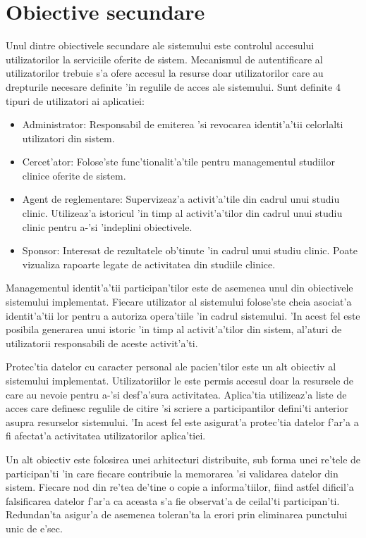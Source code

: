 \documentclass[12pt,a4paper,twoside]{report}
\begin{document}
\section{Obiective secundare}

    Unul dintre obiectivele secundare ale sistemului este controlul accesului utilizatorilor la serviciile oferite de sistem. Mecanismul de autentificare al utilizatorilor trebuie s'a ofere accesul la resurse doar utilizatorilor care au drepturile necesare definite 'in regulile de acces ale sistemului.
    Sunt definite 4 tipuri de utilizatori ai aplicatiei:
    \begin{itemize}
        \item Administrator: Responsabil de emiterea 'si revocarea identit'a'tii celorlalti utilizatori din sistem. 
        \item Cercet'ator: Folose'ste func'tionalit'a'tile pentru managementul studiilor clinice oferite de sistem. 
        \item Agent de reglementare: Supervizeaz'a activit'a'tile din cadrul unui studiu clinic. Utilizeaz'a istoricul 'in timp al activit'a'tilor din cadrul unui studiu clinic pentru a-'si 'indeplini obiectivele.
        \item Sponsor: Interesat de rezultatele ob'tinute 'in cadrul unui studiu clinic. Poate vizualiza rapoarte legate de activitatea din studiile clinice.
    \end{itemize}
    
    Managementul identit'a'tii participan'tilor este de asemenea unul din obiectivele sistemului implementat. Fiecare utilizator al sistemului folose'ste cheia asociat'a identit'a'tii lor pentru a autoriza opera'tiile 'in cadrul sistemului. 'In acest fel este posibila generarea unui istoric 'in timp al activit'a'tilor din sistem, al'aturi de utilizatorii responsabili de aceste activit'a'ti.
    
    Protec'tia datelor cu caracter personal ale pacien'tilor este un alt obiectiv al sistemului implementat. Utilizatoriilor le este permis accesul doar la resursele de care au nevoie pentru a-'si desf'a'sura activitatea. Aplica'tia utilizeaz'a liste de acces care definesc regulile de citire 'si scriere a participantilor defini'ti anterior asupra resurselor sistemului. 'In acest fel este asigurat'a protec'tia datelor f'ar'a a fi afectat'a activitatea utilizatorilor aplica'tiei.
    
    Un alt obiectiv este folosirea unei arhitecturi distribuite, sub forma unei re'tele de participan'ti 'in care fiecare contribuie la memorarea 'si validarea datelor din sistem. Fiecare nod din re'tea de'tine o copie a informa'tiilor, fiind astfel dificil'a falsificarea datelor f'ar'a ca aceasta s'a fie observat'a de ceilal'ti participan'ti. Redundan'ta asigur'a de asemenea toleran'ta la erori prin eliminarea punctului unic de e'sec.
    
\end{document}
